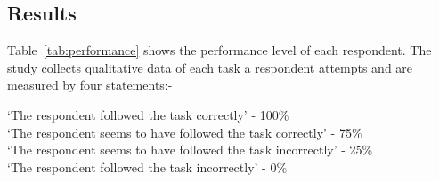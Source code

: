 \documentclass[a0,portrait]{a0poster}
\begin{document}
\begin{multicols}{2}
\section*{Results}
Table~\ref{tab:performance} shows the performance level of each respondent. The study collects qualitative data of each task a respondent attempts and are measured by four statements:-
\begin{center}
    `The respondent followed the task correctly' - 100\%\\
    `The respondent seems to have followed the task correctly' - 75\%\\
    `The respondent seems to have followed the task incorrectly' - 25\%\\
    `The respondent followed the task incorrectly' - 0\%
\end{center}
%
\begin{center}\vspace{1cm}
    \label{tab:performance}
\end{center}
%



\end{multicols}
\end{document}
